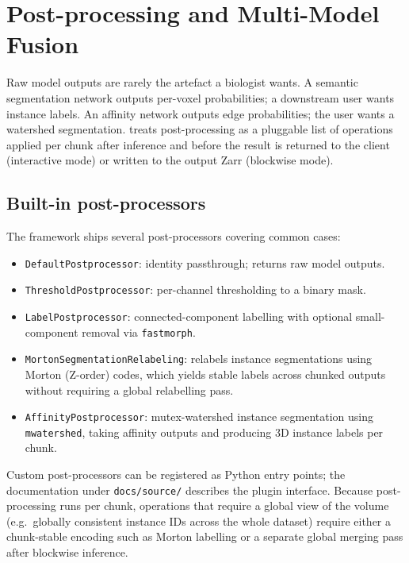 \section{Post-processing and Multi-Model Fusion}
\label{sec:postprocessing}

Raw model outputs are rarely the artefact a biologist wants. A semantic segmentation network outputs per-voxel probabilities; a downstream user wants instance labels. An affinity network outputs edge probabilities; the user wants a watershed segmentation. \cellmapflow{} treats post-processing as a pluggable list of operations applied per chunk after inference and before the result is returned to the client (interactive mode) or written to the output Zarr (blockwise mode).

\subsection*{Built-in post-processors}

The framework ships several post-processors covering common cases:

\begin{itemize}
\item \texttt{DefaultPostprocessor}: identity passthrough; returns raw model outputs.
\item \texttt{ThresholdPostprocessor}: per-channel thresholding to a binary mask.
\item \texttt{LabelPostprocessor}: connected-component labelling with optional small-component removal via \texttt{fastmorph}.
\item \texttt{MortonSegmentationRelabeling}: relabels instance segmentations using Morton (Z-order) codes, which yields stable labels across chunked outputs without requiring a global relabelling pass.
\item \texttt{AffinityPostprocessor}: mutex-watershed instance segmentation \cite{Wolf2018} using \texttt{mwatershed}, taking affinity outputs and producing 3D instance labels per chunk.
\end{itemize}

Custom post-processors can be registered as Python entry points; the documentation under \texttt{docs/source/} describes the plugin interface. Because post-processing runs per chunk, operations that require a global view of the volume (e.g.\ globally consistent instance IDs across the whole dataset) require either a chunk-stable encoding such as Morton labelling or a separate global merging pass after blockwise inference.

